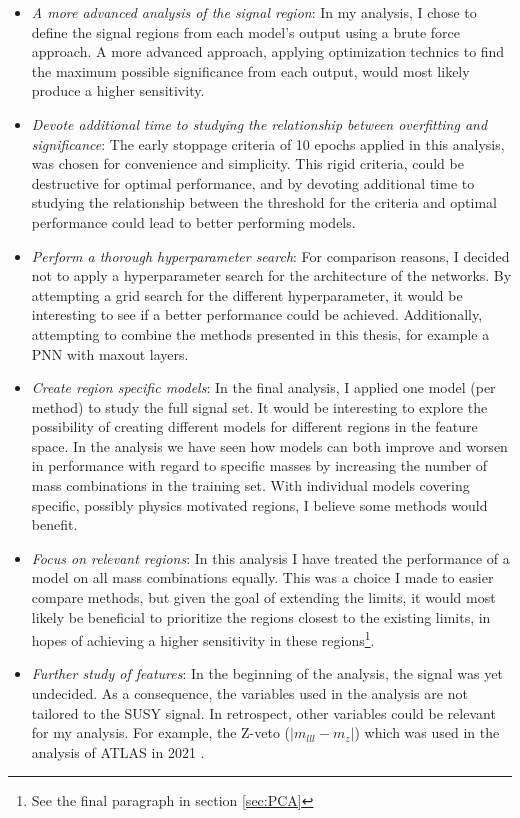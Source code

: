 \begin{itemize}
    \item \emph{A more advanced analysis of the signal region}: In my analysis, I chose to define the signal regions from each model's output using a brute force approach. 
          A more advanced approach, applying optimization technics to find the maximum possible significance from each output, would most likely produce a higher sensitivity.
    \item \emph{Devote additional time to studying the relationship between overfitting and significance}: The early stoppage criteria of 10 epochs applied in this analysis, was chosen 
          for convenience and simplicity. This rigid criteria, could be destructive for optimal performance, and by devoting additional time to studying
          the relationship between the threshold for the criteria and optimal performance could lead to better performing models.
    \item \emph{Perform a thorough hyperparameter search}: For comparison reasons, I decided not to apply a hyperparameter search for the architecture of the networks. By attempting 
           a grid search for the different hyperparameter, it would be interesting to see if a better performance could be achieved. Additionally, attempting to combine the methods presented 
           in this thesis, for example a \ac{PNN} with maxout layers. 
    \item \emph{Create region specific models}: In the final analysis, I applied one model (per method) to study the full signal set. It would be interesting to explore the possibility of creating
          different models for different regions in the feature space. In the analysis we have seen how models can both improve and worsen in performance with regard to specific masses by increasing
          the number of mass combinations in the training set. With individual models covering specific, possibly physics motivated regions, I believe some methods would benefit.
    \item \emph{Focus on relevant regions}: In this analysis I have treated the performance of a model on all mass combinations equally. This was a choice I made to easier compare methods, but 
          given the goal of extending the limits, it would most likely be beneficial to prioritize the regions closest to the existing limits, in hopes of achieving a higher sensitivity in these 
          regions\footnote{See the final paragraph in section \ref{sec:PCA}}.  
    \item \emph{Further study of features}: In the beginning of the analysis, the signal was yet undecided. As a consequence, the variables used in the analysis are not tailored to the \ac{SUSY} 
          signal. In retrospect, other variables could be relevant for my analysis. For example, the Z-veto ($|m_{lll}-m_z|$) which was used in the analysis of \ac{ATLAS} in 2021 \cite{atlas_search_2021}. 
\end{itemize}

